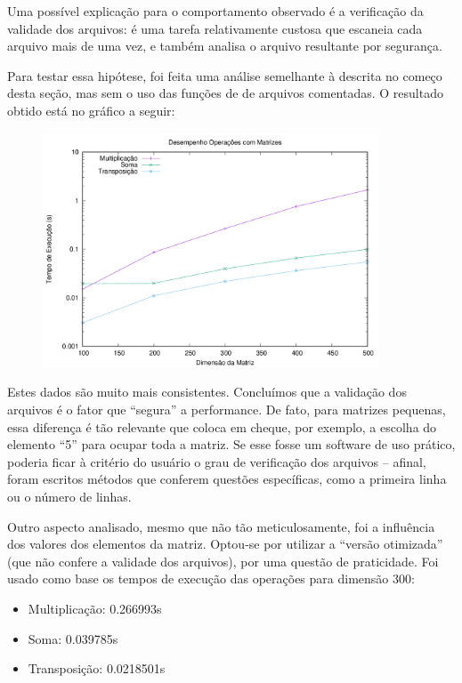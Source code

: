 \documentclass{article}
\begin{document}
Uma possível explicação para o comportamento observado é a verificação da validade dos arquivos: é uma tarefa relativamente custosa que escaneia cada arquivo mais de uma vez, e também analisa o arquivo resultante por segurança.

Para testar essa hipótese, foi feita uma análise semelhante à descrita no começo desta seção, mas sem o uso das funções de de arquivos comentadas. O resultado obtido está no gráfico a seguir: 

\begin{figure} [H]
    \includegraphics[width=10cm]{opt-params-perf.png} 
    \centering
\end{figure}

Estes dados são muito mais consistentes. Concluímos que a validação dos arquivos é o fator que ``segura'' a performance. De fato, para matrizes pequenas, essa diferença é tão relevante que coloca em cheque, por exemplo, a escolha do elemento ``5'' para ocupar toda a matriz. Se esse fosse um software de uso prático, poderia ficar à critério do usuário o grau de verificação dos arquivos -- afinal, foram escritos métodos que conferem questões específicas, como a primeira linha ou o número de linhas.

Outro aspecto analisado, mesmo que não tão meticulosamente, foi a influência dos valores dos elementos da matriz. Optou-se por utilizar a ``versão otimizada'' (que não confere a validade dos arquivos), por uma questão de praticidade. Foi usado como base os tempos de execução das operações para dimensão 300:

\begin{itemize}
    \item Multiplicação: 0.266993s
    \item Soma: 0.039785s
    \item Transposição: 0.0218501s
\end{itemize}
\end{document}
